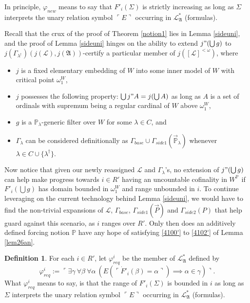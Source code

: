 \documentclass[12pt, twoside]{memoir}
\numberwithin{equation}{section}
\theoremstyle{definition}
\newtheorem{defi}[thm]{Definition}
\theoremstyle{remark}
\theoremstyle{definition}
\theoremstyle{definition}
\theoremstyle{definition}
\theoremstyle{remark}
\begin{document}
In principle, $\varphi_{new}$ means to say that $F'_i(\Sigma)$ is strictly increasing as long as $\Sigma$ interprets the unary relation symbol $\ulcorner E \urcorner$ occurring in $\mathcal{L}^*_{\mathfrak{A}}$ (formulas).

Recall that the crux of the proof of Theorem \ref{notion1} lies in Lemma \ref{sideuni}, and the proof of Lemma \ref{sideuni} hinges on the ability to extend $j" (\bigcup g)$ to $j(\Gamma_{\lambda^{\dagger}})(j(\mathcal{L}), j(\mathfrak{A}))$-certify a particular member of $j([\mathcal{L}]^{< \omega})$, where
\begin{itemize}
    \item $j$ is a fixed elementary embedding of $W$ into some inner model of $W$ with critical point $\omega_1^W$,
    \item $j$ possesses the following property: $\bigcup j" A = j(\bigcup A)$ as long as $A$ is a set of ordinals with supremum being a regular cardinal of $W$ above $\omega^W_1$, 
    \item $g$ is a $\mathbb{P}_{\lambda}$-generic filter over $W$ for some $\lambda \in C$, and
    \item $\Gamma_{\lambda}$ can be considered definitionally as $\Gamma_{base} \cup \Gamma_{side1}(\Vec{\mathbb{P}}_{\lambda})$ whenever $\lambda \in C \cup \{\lambda^{\dagger}\}$.
\end{itemize}
Now notice that given our newly reassigned $\mathcal{L}$ and $\Gamma_{\lambda}$'s, no extension of $j" (\bigcup g)$ can help make progress towards $i \in R'$ having an uncountable cofinality in $W^{\mathbb{P}}$ if $F'_i(\bigcup g)$ has domain bounded in $\omega_1^W$ and range unbounded in $i$. To continue leveraging on the current technology behind Lemma \ref{sideuni}, we would have to find the non-trivial expansions of $\mathcal{L}$, $\Gamma_{base}$, $\Gamma_{side1}(\Vec{P})$ and $\Gamma_{side2}(P)$ that help guard against this scenario, as $i$ ranges over $R'$. Only then does an additively defined forcing notion $\mathbb{P}$ have any hope of satisfying \ref{4100'} to \ref{4102'} of Lemma \ref{lem26an}.

\begin{defi}
For each $i \in R'$, let $\varphi^i_{req}$ be the member of $\mathcal{L}^*_{\mathfrak{A}}$ defined by
\begin{equation*}
    \varphi^i_{req} := \ulcorner \exists \gamma \ \forall \beta \ \forall \alpha \ (E(\ulcorner \dot{F}'_i (\beta) = \alpha \urcorner) \implies \alpha \in \gamma) \urcorner \text{.}
\end{equation*}
What $\varphi^i_{req}$ means to say, is that the range of $F'_i(\Sigma)$ is bounded in $i$ as long as $\Sigma$ interprets the unary relation symbol $\ulcorner E \urcorner$ occurring in $\mathcal{L}^*_{\mathfrak{A}}$ (formulas).
\end{defi}
\end{document}
